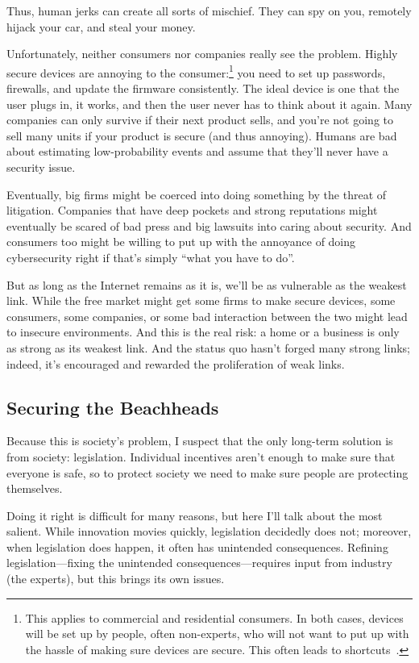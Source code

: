 Thus, human jerks can create all sorts of mischief.  They can spy on
you, remotely hijack your car, and steal your money.  

Unfortunately, neither consumers nor companies really see the problem.
Highly secure devices are annoying to the consumer:\footnote{This
  applies to commercial and residential consumers.  In both cases,
  devices will be set up by people, often non-experts, who will not
  want to put up with the hassle of making sure devices are secure.
  This often leads to shortcuts~\cite{}.}  you need to set up
passwords, firewalls, and update the firmware consistently.  The ideal
device is one that the user plugs in, it works, and then the user
never has to think about it again.  Many companies can only survive if
their next product sells, and you're not going to sell many units if
your product is secure (and thus annoying).  Humans are bad about
estimating low-probability events and assume that they'll never have a
security issue.

Eventually, big firms might be coerced into doing something by the
threat of litigation.  Companies that have deep pockets and strong
reputations might eventually be scared of bad press and big lawsuits
into caring about security.  And consumers too might be willing to put
up with the annoyance of doing cybersecurity right if that's simply
``what you have to do''.

But as long as the Internet remains as it is, we'll be as vulnerable
as the weakest link.  While the free market might get some firms to
make secure devices, some consumers, some companies, or some bad
interaction between the two might lead to insecure environments.  And
this is the real risk: a home or a business is only as strong as its
weakest link.  And the status quo hasn't forged many strong links;
indeed, it's encouraged and rewarded the proliferation of weak links.

\subsection{Securing the Beachheads}

Because this is society's problem, I suspect that the only long-term
solution is from society: legislation.  Individual incentives aren't
enough to make sure that everyone is safe, so to protect society we
need to make sure people are protecting themselves.

Doing it right is difficult for many reasons, but here I'll talk about
the most salient.  While innovation movies quickly, legislation
decidedly does not; moreover, when legislation does happen, it often
has unintended consequences.  Refining legislation---fixing the
unintended consequences---requires input from industry (the experts),
but this brings its own issues.

